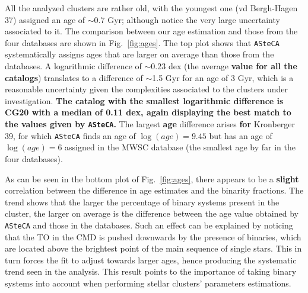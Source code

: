 \documentclass[referee]{aa}
\begin{document}
  All the analyzed clusters are rather old, with the youngest one (vd
  Bergh-Hagen 37) assigned an age of $\sim0.7$ Gyr; although notice the very
  large uncertainty associated to it.
  The comparison between our age estimation and those from
  the four databases are shown in Fig.~\ref{fig:ages}. The top plot
  shows that \texttt{ASteCA} systematically assigns ages that are larger on
  average than those from the databases.
  A logarithmic difference of $\sim$0.23 dex (the average \textbf{value for
  all the catalogs}) translates to a difference of $\sim$1.5 Gyr for
  an age of 3 Gyr, which is a reasonable uncertainty given the complexities
  associated to the clusters under investigation. \textbf{The catalog with the
  smallest logarithmic difference is CG20 with a median of 0.11 dex, again
  displaying the best match to the values given by \texttt{ASteCA}.}
  The largest \textbf{age} difference arises \textbf{for} Kronberger 39, for
  which \texttt{ASteCA} finds an age of $\log(age)=9.45$ but has an age of
  $\log(age)=6$ assigned in the MWSC database (the smallest age by far in the four
  databases).

  As can be seen in the bottom plot of Fig.~\ref{fig:ages}, there appears to be
  a \textbf{slight} correlation between the difference in age estimates and the
  binarity fractions. The trend shows that the larger the percentage of
  binary systems present in the cluster, the larger on average is the difference
  between the age value obtained by \texttt{ASteCA} and those in the
  databases. Such an effect can be explained by noticing that the TO in the CMD
  is pushed downwards by the presence of binaries, which are located above the
  brightest point of the main sequence of single stars. This in turn forces the
  fit to adjust towards larger ages, hence producing the systematic trend
  seen in the analysis. This result points to the importance of taking binary
  systems into account when performing stellar clusters' parameters estimations.
  \\
\end{document}
